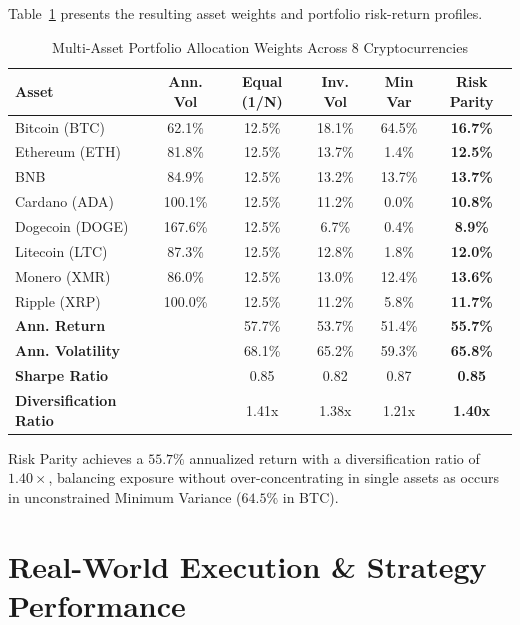 \documentclass[10pt,journal,compsoc]{IEEEtran}
\begin{document}
Table~\ref{tab:portfolio_weights} presents the resulting asset weights and portfolio risk-return profiles.

\begin{table}[h]
\centering
\caption{Multi-Asset Portfolio Allocation Weights Across 8 Cryptocurrencies}
\label{tab:portfolio_weights}
\scriptsize
\begin{tabular}{@{}lccccc@{}}
\toprule
\textbf{Asset} & \textbf{Ann. Vol} & \textbf{Equal (1/N)} & \textbf{Inv. Vol} & \textbf{Min Var} & \textbf{Risk Parity} \\
\midrule
Bitcoin (BTC) & 62.1\% & 12.5\% & 18.1\% & 64.5\% & \textbf{16.7\%} \\
Ethereum (ETH) & 81.8\% & 12.5\% & 13.7\% & 1.4\% & \textbf{12.5\%} \\
BNB & 84.9\% & 12.5\% & 13.2\% & 13.7\% & \textbf{13.7\%} \\
Cardano (ADA) & 100.1\% & 12.5\% & 11.2\% & 0.0\% & \textbf{10.8\%} \\
Dogecoin (DOGE)& 167.6\% & 12.5\% & 6.7\% & 0.4\% & \textbf{8.9\%} \\
Litecoin (LTC) & 87.3\% & 12.5\% & 12.8\% & 1.8\% & \textbf{12.0\%} \\
Monero (XMR) & 86.0\% & 12.5\% & 13.0\% & 12.4\% & \textbf{13.6\%} \\
Ripple (XRP) & 100.0\% & 12.5\% & 11.2\% & 5.8\% & \textbf{11.7\%} \\
\midrule
\textbf{Ann. Return} & & 57.7\% & 53.7\% & 51.4\% & \textbf{55.7\%} \\
\textbf{Ann. Volatility} & & 68.1\% & 65.2\% & 59.3\% & \textbf{65.8\%} \\
\textbf{Sharpe Ratio} & & 0.85 & 0.82 & 0.87 & \textbf{0.85} \\
\textbf{Diversification Ratio}& & 1.41x & 1.38x & 1.21x & \textbf{1.40x} \\
\bottomrule
\end{tabular}
\end{table}

Risk Parity achieves a $55.7\%$ annualized return with a diversification ratio of $1.40\times$, balancing exposure without over-concentrating in single assets as occurs in unconstrained Minimum Variance ($64.5\%$ in BTC).

\section{Real-World Execution \& Strategy Performance}
\end{document}
